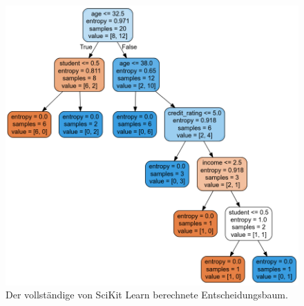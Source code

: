 \documentclass[11pt,a4paper]{article}
\begin{document}
\begin{figure}
	\centering
	\includegraphics[width=1\linewidth]{bilder/tree_scikit_entropy}
	\caption{Der vollständige von SciKit Learn berechnete Entscheidungsbaum.}
	\label{fig:treescikitentropy}
\end{figure}
\end{document}
